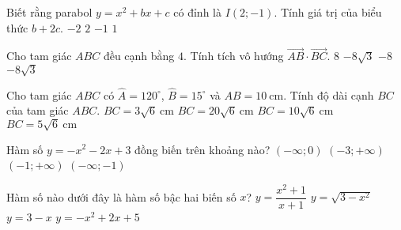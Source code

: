 \begin{ex}%
	Biết rằng parabol $y=x^2+bx+c$ có đỉnh là $I(2 ;-1)$. Tính giá trị của biểu thức $b+2c$.
	\choice
	{$-2$}
	{\True $2$}
	{$-1$}
	{$1$}
\end{ex}
\begin{ex}%
	Cho tam giác $ABC$ đều cạnh bằng $4$. Tính tích vô hướng $\overrightarrow{AB} \cdot \overrightarrow{BC}$.
	\choice
	{$8$}
	{$-8 \sqrt{3}$}
	{\True $-8$}
	{$-8 \sqrt{3}$}
\end{ex}
\begin{ex}%
	Cho tam giác $ABC$ có $\widehat{A}=120^{\circ}$, $\widehat{B}=15^{\circ}$ và $AB=10 \mathrm{~cm}$. Tính độ dài cạnh $BC$ của tam giác $ABC$.
	\choice
	{$BC=3 \sqrt{6} \mathrm{~cm}$}
	{$BC=20 \sqrt{6} \mathrm{~cm}$}
	{$BC=10 \sqrt{6} \mathrm{~cm}$}
	{\True $BC=5 \sqrt{6} \mathrm{~cm}$}
\end{ex}
\begin{ex}%
	Hàm số $y=-x^2-2x+3$ đồng biến trên khoảng nào?
	\choice
	{$(-\infty ; 0)$}
	{$(-3 ;+\infty)$}
	{$(-1 ;+\infty)$}
	{\True $(-\infty ;-1)$}
\end{ex}
\begin{ex}%
	Hàm số nào dưới đây là hàm số bậc hai biến số $x$?
	\choice
	{$y=\dfrac{x^2+1}{x+1}$}
	{$y=\sqrt{3-x^2}$}
	{$y=3-x$}
	{\True $y=-x^2+2x+5$}
\end{ex}
